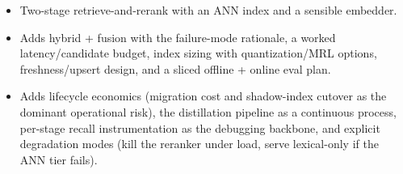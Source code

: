 \begin{interviewq}

\goodgreat
\begin{itemize}
    \item {} Two-stage retrieve-and-rerank with an ANN index and a sensible embedder.
    \item {} Adds hybrid + fusion with the failure-mode rationale, a worked latency/candidate budget, index sizing with quantization/MRL options, freshness/upsert design, and a sliced offline + online eval plan.
    \item {} Adds lifecycle economics (migration cost and shadow-index cutover as the dominant operational risk), the distillation pipeline as a continuous process, per-stage recall instrumentation as the debugging backbone, and explicit degradation modes (kill the reranker under load, serve lexical-only if the ANN tier fails).
\end{itemize}

\end{interviewq}


